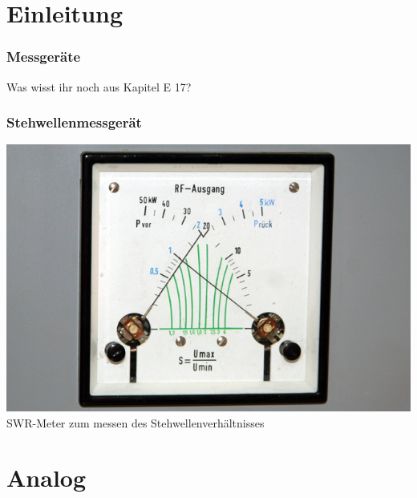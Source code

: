 

\subtitle{Technik A 16: \\
          Messtechnik \\[2em]}
\date{Stand 23.05.2016}



\section*{Einleitung}

\begin{frame}
    \frametitle{Messgeräte}
    {\Large Was wisst ihr noch aus Kapitel E 17?}
\end{frame}

\begin{frame}
  \frametitle{Stehwellenmessgerät}
  \begin{center}
    \includegraphics[width=1\textwidth,height=.8\textheight,keepaspectratio]{a16/RS_SWR.jpg}\\
    {\tiny SWR-Meter zum messen des Stehwellenverhältnisses \hyperlink{refs}{\cite{wmen}}}
  \end{center}
\end{frame}

\section*{Analog}

